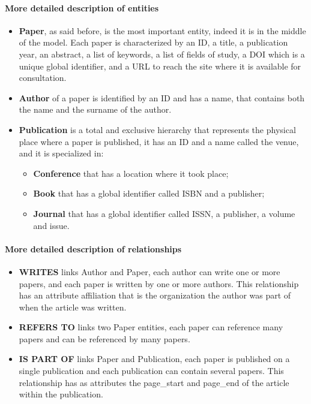 \paragraph{More detailed description of entities}
\begin{itemize}
    \item \textbf{Paper}, as said before, is the most important entity, indeed it is in the middle of the model.
    Each paper is characterized by an ID, a title, a publication year, an abstract, a list of keywords, a list of fields of study, a DOI which is a unique global identifier, and a URL to reach the site where it is available for consultation.
    \item \textbf{Author} of a paper is identified by an ID and has a name, that contains both the name and the surname of the author.
    \item \textbf{Publication} is a total and exclusive hierarchy that represents the physical place where a paper is published, it has an ID and a name called the venue, and it is specialized in:
    \begin{itemize}
        \item \textbf{Conference} that has a location where it took place;
        \item \textbf{Book} that has a global identifier called ISBN and a publisher;
        \item \textbf{Journal} that has a global identifier called ISSN, a publisher,
        a volume and issue.
    \end{itemize}
\end{itemize}

\paragraph{More detailed description of relationships}
\begin{itemize}
    \item \textbf{WRITES} links Author and Paper, each author can write one or more papers, and each paper is written by one or more authors.
    This relationship has an attribute affiliation that is the organization the author was part of when the article was written.
    \item \textbf{REFERS TO} links two Paper entities, each paper can reference many papers and can be referenced by many papers.
    \item \textbf{IS PART OF} links Paper and Publication, each paper is published on a single publication and each publication can contain several papers.
    This relationship has as attributes the page\_start and page\_end of the article within the publication.
\end{itemize}

